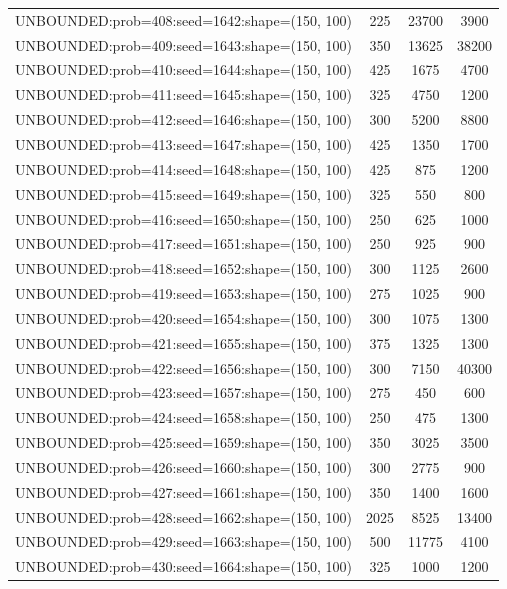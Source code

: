\begin{longtable}{lccc}
UNBOUNDED:prob=408:seed=1642:shape=(150, 100) &      225 & 23700 &   3900 \\
UNBOUNDED:prob=409:seed=1643:shape=(150, 100) &      350 & 13625 &  38200 \\
UNBOUNDED:prob=410:seed=1644:shape=(150, 100) &      425 &  1675 &   4700 \\
UNBOUNDED:prob=411:seed=1645:shape=(150, 100) &      325 &  4750 &   1200 \\
UNBOUNDED:prob=412:seed=1646:shape=(150, 100) &      300 &  5200 &   8800 \\
UNBOUNDED:prob=413:seed=1647:shape=(150, 100) &      425 &  1350 &   1700 \\
UNBOUNDED:prob=414:seed=1648:shape=(150, 100) &      425 &   875 &   1200 \\
UNBOUNDED:prob=415:seed=1649:shape=(150, 100) &      325 &   550 &    800 \\
UNBOUNDED:prob=416:seed=1650:shape=(150, 100) &      250 &   625 &   1000 \\
UNBOUNDED:prob=417:seed=1651:shape=(150, 100) &      250 &   925 &    900 \\
UNBOUNDED:prob=418:seed=1652:shape=(150, 100) &      300 &  1125 &   2600 \\
UNBOUNDED:prob=419:seed=1653:shape=(150, 100) &      275 &  1025 &    900 \\
UNBOUNDED:prob=420:seed=1654:shape=(150, 100) &      300 &  1075 &   1300 \\
UNBOUNDED:prob=421:seed=1655:shape=(150, 100) &      375 &  1325 &   1300 \\
UNBOUNDED:prob=422:seed=1656:shape=(150, 100) &      300 &  7150 &  40300 \\
UNBOUNDED:prob=423:seed=1657:shape=(150, 100) &      275 &   450 &    600 \\
UNBOUNDED:prob=424:seed=1658:shape=(150, 100) &      250 &   475 &   1300 \\
UNBOUNDED:prob=425:seed=1659:shape=(150, 100) &      350 &  3025 &   3500 \\
UNBOUNDED:prob=426:seed=1660:shape=(150, 100) &      300 &  2775 &    900 \\
UNBOUNDED:prob=427:seed=1661:shape=(150, 100) &      350 &  1400 &   1600 \\
UNBOUNDED:prob=428:seed=1662:shape=(150, 100) &     2025 &  8525 &  13400 \\
UNBOUNDED:prob=429:seed=1663:shape=(150, 100) &      500 & 11775 &   4100 \\
UNBOUNDED:prob=430:seed=1664:shape=(150, 100) &      325 &  1000 &   1200 \\

\end{longtable}
